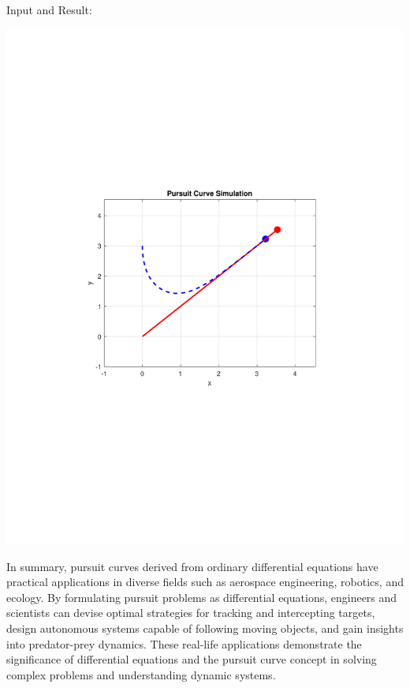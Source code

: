 \documentclass[13pt,a4paper]{report}
\begin{document}
Input and Result:\\[-0.35cm]

\begin{center}
\includegraphics[trim={3.6cm 8.35cm 3.25cm 8cm},clip,scale=0.75]{pdfs/pursuit_curve.pdf}
\end{center}

In summary, pursuit curves derived from ordinary differential equations have practical applications in diverse fields such as aerospace engineering, robotics, and ecology. By formulating pursuit problems as differential equations, engineers and scientists can devise optimal strategies for tracking and intercepting targets, design autonomous systems capable of following moving objects, and gain insights into predator-prey dynamics. These real-life applications demonstrate the significance of differential equations and the pursuit curve concept in solving complex problems and understanding dynamic systems.
\end{document}
